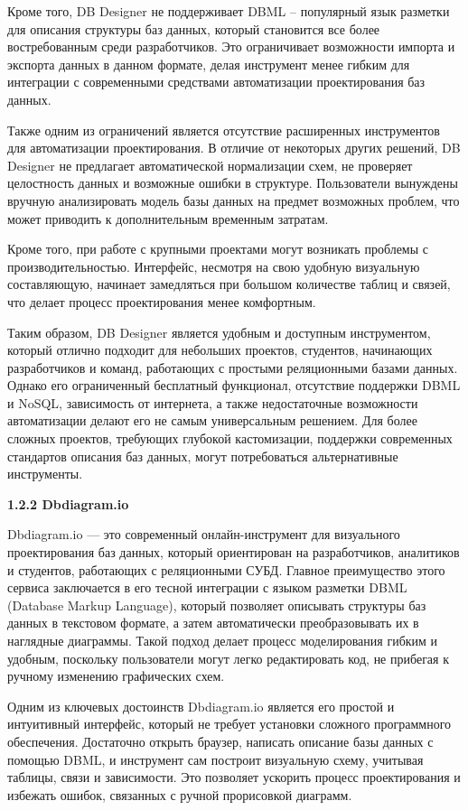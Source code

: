 Кроме того, DB Designer не поддерживает DBML – популярный язык разметки для описания структуры баз данных, который становится все более востребованным среди разработчиков. Это ограничивает возможности импорта и экспорта данных в данном формате, делая инструмент менее гибким для интеграции с современными средствами автоматизации проектирования баз данных.

Также одним из ограничений является отсутствие расширенных инструментов для автоматизации проектирования. В отличие от некоторых других решений, DB Designer не предлагает автоматической нормализации схем, не проверяет целостность данных и возможные ошибки в структуре. Пользователи вынуждены вручную анализировать модель базы данных на предмет возможных проблем, что может приводить к дополнительным временным затратам.

Кроме того, при работе с крупными проектами могут возникать проблемы с производительностью. Интерфейс, несмотря на свою удобную визуальную составляющую, начинает замедляться при большом количестве таблиц и связей, что делает процесс проектирования менее комфортным.

Таким образом, DB Designer является удобным и доступным инструментом, который отлично подходит для небольших проектов, студентов, начинающих разработчиков и команд, работающих с простыми реляционными базами данных. Однако его ограниченный бесплатный функционал, отсутствие поддержки DBML и NoSQL, зависимость от интернета, а также недостаточные возможности автоматизации делают его не самым универсальным решением. Для более сложных проектов, требующих глубокой кастомизации, поддержки современных стандартов описания баз данных, могут потребоваться альтернативные инструменты.

\textbf{\large 1.2.2 Dbdiagram.io }

Dbdiagram.io — это современный онлайн-инструмент для визуального проектирования баз данных, который ориентирован на разработчиков, аналитиков и студентов, работающих с реляционными СУБД. Главное преимущество этого сервиса заключается в его тесной интеграции с языком разметки DBML (Database Markup Language), который позволяет описывать структуры баз данных в текстовом формате, а затем автоматически преобразовывать их в наглядные диаграммы. Такой подход делает процесс моделирования гибким и удобным, поскольку пользователи могут легко редактировать код, не прибегая к ручному изменению графических схем.

Одним из ключевых достоинств Dbdiagram.io является его простой и интуитивный интерфейс, который не требует установки сложного программного обеспечения. Достаточно открыть браузер, написать описание базы данных с помощью DBML, и инструмент сам построит визуальную схему, учитывая таблицы, связи и зависимости. Это позволяет ускорить процесс проектирования и избежать ошибок, связанных с ручной прорисовкой диаграмм.

